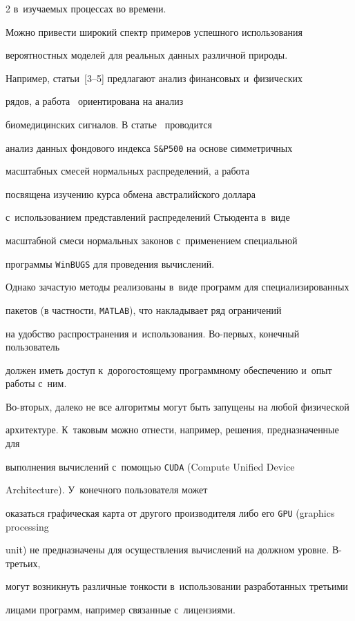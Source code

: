 \begin{multicols}{2}
в~изучаемых процессах во времени.



Можно привести широкий спектр примеров успешного использования

вероятностных моделей для реальных данных различной природы.

Например, статьи~[3--5] предлагают анализ финансовых и~физических

рядов, а работа~\cite{Hamedi2015} ориентирована на анализ

биомедицинских сигналов. В статье~\cite{Abanto2010} проводится

анализ данных фондового индекса \verb"S&P500" на основе симметричных

масштабных смесей нормальных распределений, а работа~\cite{Wang2011}

посвящена изучению курса обмена австралийского доллара 

с~использованием представлений распределений Стьюдента в~виде

масштабной смеси нормальных законов с~применением специальной

программы \verb"WinBUGS" для проведения вычислений.



Однако зачастую методы реализованы в~виде программ для специализированных 

пакетов (в частности, \verb"MATLAB"), что накладывает ряд ограничений 

на удобство распространения и~использования.  Во-пер\-вых, конечный пользователь 

должен иметь доступ к~дорогостоящему программному обеспечению и~опыт работы с~ним. 

Во-вто\-рых, далеко не все алгоритмы могут быть запущены на любой физической 

архитектуре. К~таковым можно отнести, например, решения, предназначенные для 

выполнения вычислений с~по\-мощью  \verb"CUDA" (Compute Unified Device

Architecture).  У~конечного пользователя может 

оказаться графическая карта от другого производителя либо его  \verb"GPU"  (graphics processing

unit) не предназначены для осуществления вычислений на должном уровне. В-третьих, 

могут возникнуть различные тонкости в~использовании разработанных третьими 

лицами программ, например связанные с~лицензиями. 




\end{multicols}
